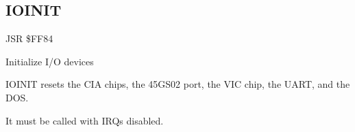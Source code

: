 
\newpage
\subsection{IOINIT}
\label{KERNAL Jump Table!IOINIT}
\begin{description}[leftmargin=2cm,style=nextline]
    \item [Address:] JSR \$FF84
    \item [Description:] Initialize I/O devices
    \item [Remarks:]
        IOINIT resets the CIA chips, the 45GS02 port, the VIC chip, the UART, and the DOS.

        It must be called with IRQs disabled.
    \item [Example:]
\end{description}



\newpage
